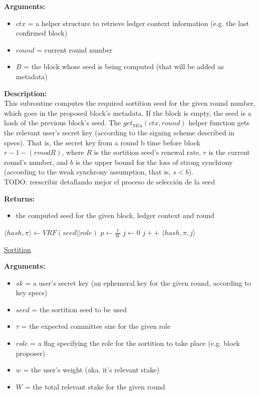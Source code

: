\documentclass[10pt,a4paper]{article}
\begin{document}
\noindent \textbf{Arguments:}
\begin{itemize}
    \item $ctx$ = a helper structure to retrieve ledger context information (e.g. the last confirmed block)
    \item $round$ = current round number
    \item $B$ = the block whose seed is being computed (that will be added as metadata)
  \end{itemize}


\noindent \textbf{Description:}\\
This subroutine computes the required sortition seed for the given round number, which goes in the proposed block's metadata.
If the block is empty, the seed is a hash of the previous block's seed.
The $get_{SKu}(ctx, round)$ helper function gets the relevant user's secret key (according to the signing scheme described in specs).
That is, the secret key from a round b time before block $r-1-(r mod R)$, where $R$ is the sortition seed's renewal rate, $r$ is the current round's number,
and $b$ is the upper bound for the loss of strong synchrony (according to the weak synchrony assumption, that is, $s < b$).\\

TODO: reescribir detallando mejor el proceso de selección de la seed

\noindent \textbf{Returns:}
\begin{itemize}
    \item the computed seed for the given block, ledger context and round
  \end{itemize}

\begin{algorithm}
    \begin{algorithmic}[H]
        \State $ \langle hash, \pi \rangle \gets VRF(seed||role)$
        \State $p \gets \frac{t}{W}$
        \State $j \gets 0$
        \While{$\frac{hash}{2^{hashlen}}\notin [ \sum_{k=0}^jB(k;w,p), \sum_{k=0}^{j+1}B(k;w,p))$}
            \State $j++$
        \EndWhile
        \Return $ \langle hash,\pi,j \rangle$
    \EndFunction
    \end{algorithmic}
    \caption{\underline{Sortition}}
\end{algorithm}


\noindent \textbf{Arguments:}
\begin{itemize}
    \item $sk$ = a user's secret key (an ephemeral key for the given round, according to key specs)
    \item $seed$ = the sortition seed to be used
    \item $\tau$ = the expected committee size for the given role
    \item $role$ = a flag specifying the role for the sortition to take place (e.g. block proposer)
    \item $w$ = the user's weight (aka. it's relevant stake)
    \item $W$ = the total relevant stake for the given round
  \end{itemize}
\end{document}
